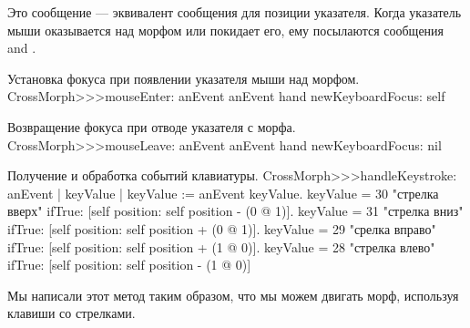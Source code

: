 \documentclass[a4paper,10pt,twoside]{book}
\begin{document}
\noindent
Это сообщение --- эквивалент сообщения  для позиции указателя.
Когда указатель мыши оказывается над морфом или покидает его, ему посылаются сообщения  and .

\begin{method}{Установка фокуса при появлении указателя мыши над морфом.}
CrossMorph>>>mouseEnter: anEvent
	anEvent hand newKeyboardFocus: self
\end{method}

\begin{method}{Возвращение фокуса при отводе указателя с морфа.}
CrossMorph>>>mouseLeave: anEvent
	anEvent hand newKeyboardFocus: nil
\end{method}

\begin{method}[handleKeystroke]{Получение и обработка событий клавиатуры.}
CrossMorph>>>handleKeystroke: anEvent
	| keyValue |
	keyValue := anEvent keyValue.
	keyValue = 30	 "стрелка вверх"
		ifTrue: [self position: self position - (0 @ 1)].
	keyValue = 31	 "стрелка вниз"
		ifTrue: [self position: self position + (0 @ 1)].
	keyValue = 29	 "срелка вправо"
		ifTrue: [self position: self position + (1 @ 0)].
	keyValue = 28	 "стрелка влево"
		ifTrue: [self position: self position - (1 @ 0)]
\end{method}

Мы написали этот метод таким образом, что мы можем двигать морф, используя клавиши со стрелками.
\end{document}
